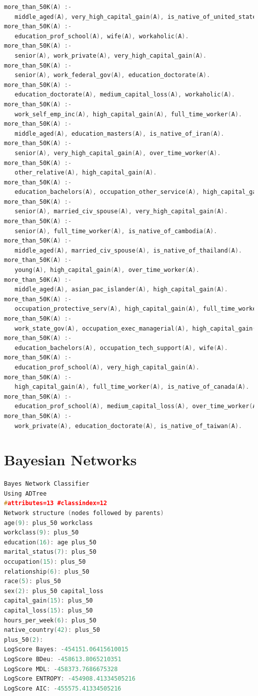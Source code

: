 \documentclass[a4paper]{llncs}
\begin{document}
\begin{lstlisting}[language=c,frame=single,breaklines=true,basicstyle=\footnotesize\ttfamily,caption={Subset of the prolog clauses produced by Aleph},label=ilp_clauses]
more_than_50K(A) :-
   middle_aged(A), very_high_capital_gain(A), is_native_of_united_states(A).
more_than_50K(A) :-
   education_prof_school(A), wife(A), workaholic(A).
more_than_50K(A) :-
   senior(A), work_private(A), very_high_capital_gain(A).
more_than_50K(A) :-
   senior(A), work_federal_gov(A), education_doctorate(A).
more_than_50K(A) :-
   education_doctorate(A), medium_capital_loss(A), workaholic(A).
more_than_50K(A) :-
   work_self_emp_inc(A), high_capital_gain(A), full_time_worker(A).
more_than_50K(A) :-
   middle_aged(A), education_masters(A), is_native_of_iran(A).
more_than_50K(A) :-
   senior(A), very_high_capital_gain(A), over_time_worker(A).
more_than_50K(A) :-
   other_relative(A), high_capital_gain(A).
more_than_50K(A) :-
   education_bachelors(A), occupation_other_service(A), high_capital_gain(A).
more_than_50K(A) :-
   senior(A), married_civ_spouse(A), very_high_capital_gain(A).
more_than_50K(A) :-
   senior(A), full_time_worker(A), is_native_of_cambodia(A).
more_than_50K(A) :-
   middle_aged(A), married_civ_spouse(A), is_native_of_thailand(A).
more_than_50K(A) :-
   young(A), high_capital_gain(A), over_time_worker(A).
more_than_50K(A) :-
   middle_aged(A), asian_pac_islander(A), high_capital_gain(A).
more_than_50K(A) :-
   occupation_protective_serv(A), high_capital_gain(A), full_time_worker(A).
more_than_50K(A) :-
   work_state_gov(A), occupation_exec_managerial(A), high_capital_gain(A).
more_than_50K(A) :-
   education_bachelors(A), occupation_tech_support(A), wife(A).
more_than_50K(A) :-
   education_prof_school(A), very_high_capital_gain(A).
more_than_50K(A) :-
   high_capital_gain(A), full_time_worker(A), is_native_of_canada(A).
more_than_50K(A) :-
   education_prof_school(A), medium_capital_loss(A), over_time_worker(A).
more_than_50K(A) :-
   work_private(A), education_doctorate(A), is_native_of_taiwan(A).
\end{lstlisting}

\clearpage
\section{Bayesian Networks}

\begin{lstlisting}[language=c,frame=single,breaklines=true,basicstyle=\footnotesize\ttfamily,caption={Bayesian Network built using a Simulated Annealing search algorithm},label=bayes_net_example]
Bayes Network Classifier
Using ADTree
#attributes=13 #classindex=12
Network structure (nodes followed by parents)
age(9): plus_50 workclass 
workclass(9): plus_50 
education(16): age plus_50 
marital_status(7): plus_50 
occupation(15): plus_50 
relationship(6): plus_50 
race(5): plus_50 
sex(2): plus_50 capital_loss 
capital_gain(15): plus_50 
capital_loss(15): plus_50 
hours_per_week(6): plus_50 
native_country(42): plus_50 
plus_50(2): 
LogScore Bayes: -454151.06415610015
LogScore BDeu: -458613.8065210351
LogScore MDL: -458373.7686675328
LogScore ENTROPY: -454908.41334505216
LogScore AIC: -455575.41334505216
\end{lstlisting}
\end{document}
